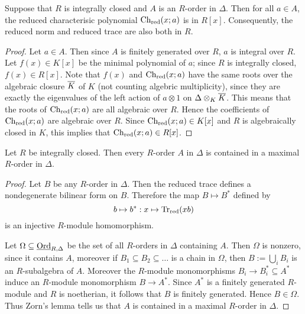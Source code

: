 \begin{lem}
Suppose that $R$ is integrally closed and $A$ is an $R$-order in $\Delta$.  Then for all $a\in A$, the reduced characterisic polynomial $\textnormal{Ch}_{\text{red}}(x;a)$ is in $R[x]$.  Consequently, the reduced norm and reduced trace are also both in $R$.
\end{lem}
\begin{proof}
Let $a\in A$.  Then since $A$ is finitely generated over $R$, $a$ is integral over $R$.  Let $f(x)\in K[x]$ be the minimal polynomial of $a$; since $R$ is integrally closed, $f(x)\in R[x]$.  Note that $f(x)$ and $\textnormal{Ch}_{\text{red}}(x;a)$ have the same roots over the algebraic closure $\overline{K}$ of $K$ (not counting algebric multiplicity), since they are exactly the eigenvalues of the left action of $a\otimes 1$ on $\Delta\otimes_K\overline{K}$.  This means that the roots of $\textnormal{Ch}_{\text{red}}(x;a)$ are all algebraic over $R$.  Hence the coefficients of $\textnormal{Ch}_{\text{red}}(x;a)$ are algebraic over $R$.  Since $\textnormal{Ch}_{\text{red}}(x;a)\in K[x]$ and $R$ is algebraically closed in $K$, this implies that $\textnormal{Ch}_{\text{red}}(x;a)\in R[x]$.
\end{proof}

\begin{prop}
Let $R$ be integrally closed.  Then every $R$-order $A$ in $\Delta$ is contained in a maximal $R$-order in $\Delta$.
\end{prop}
\begin{proof}
Let $B$ be any $R$-order in $\Delta$.  Then the reduced trace defines a nondegenerate bilinear form on $B$.  Therefore the map $B\mapsto B^*$ defined by
$$b\mapsto b^*: x\mapsto \textnormal{Tr}_{\text{red}}(xb)$$
is an injective $R$-module homomorphism.

Let $\Omega\subseteq\textnormal{\underline{Ord}}_{R,\Delta}$ be the set of all $R$-orders in $\Delta$ containing $A$.  Then $\Omega$ is nonzero, since it contains $A$, moreover if $B_1\subseteq B_2\subseteq \dots$ is a chain in $\Omega$, then $B:=\bigcup_i B_i$ is an $R$-subalgebra of $A$.  Moreover the $R$-module monomorphisms $B_i\rightarrow B_i^*\subseteq A^*$ induce an $R$-module monomorphism $B\rightarrow A^*$.  Since $A^*$ is a finitely generated $R$-module and $R$ is noetherian, it follows that $B$ is finitely generated.  Hence $B\in \Omega$.  Thus Zorn's lemma tells us that $A$ is contained in a maximal $R$-order in $\Delta$.
\end{proof}

